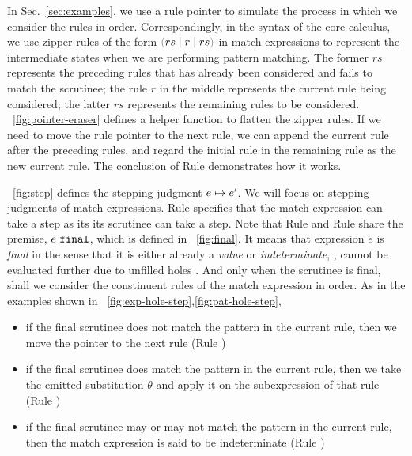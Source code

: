\documentclass[runningheads,envcountsame,a4paper]{llncs}
\begin{document}
In Sec.~\ref{sec:examples}, we use a rule pointer to simulate the process in
which we consider the rules in order. Correspondingly, in the syntax of the core
calculus, we use zipper rules of the form $\zrulsP{rs}{r}{rs}$ in match
expressions to represent the intermediate states when we are performing pattern
matching. The former $rs$ represents the preceding rules that has already been
considered and fails to match the scrutinee; the rule $r$ in the middle
represents the current rule being considered; the latter $rs$ represents the
remaining rules to be considered. \figurename~\ref{fig:pointer-eraser} defines a
helper function to flatten the zipper rules. If we need to move the rule pointer
to the next rule, we can append the current rule after the preceding rules, and
regard the initial rule in the remaining rule as the new current rule. The
conclusion of Rule \ITFailMatch demonstrates how it works.


\figurename~\ref{fig:step} defines the stepping judgment
$e \mapsto e'$. We will focus on stepping judgments of match expressions.
Rule \ITExpMatch specifies that the match expression can take a step as its its
scrutinee can take a step. Note that Rule \ITFailMatch and Rule \ITSuccMatch
share the premise, $e ~\mathtt{final}$, which is defined in \figurename~\ref{fig:final}. It
means that expression $e$ is \textit{final} in the sense that it is either already a
\textit{value} or \textit{indeterminate}, \ie, cannot be evaluated further due to unfilled holes
\cite{DBLP:journals/pacmpl/OmarVCH19}. And only when the scrutinee is final,
shall we consider the constinuent rules of the match expression in order. As in
the examples shown in \listfigurename~\ref{fig:exp-hole-step},\ref{fig:pat-hole-step},

\begin{itemize}
  \item
    if the final scrutinee does not match the pattern in the current rule,
    then we move the pointer to the next rule (Rule \ITFailMatch)

  \item
    if the final scrutinee does match the pattern in the current rule, 
    then we take the emitted substitution $\theta$ and apply it on the subexpression of that rule (Rule \ITSuccMatch)

  \item 
    if the final scrutinee may or may not match the pattern in the current rule,
    then the match expression is said to be indeterminate (Rule \IMatch)
\end{itemize}
\end{document}
